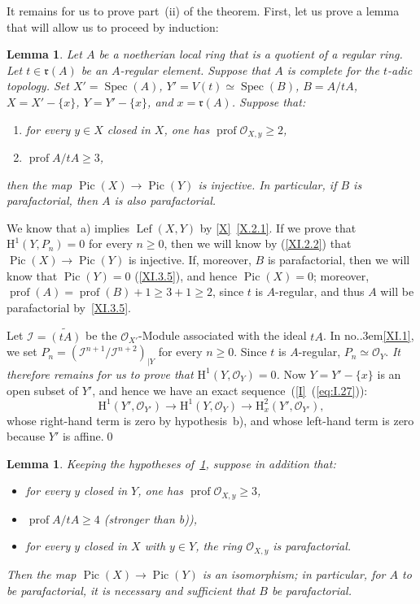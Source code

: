 \documentclass[11pt,a4paper,oneside]{book}
\providecommand{\sisi}[2]{#2}
\providecommand{\pageoriginale}{%
  \refstepcounter{pageoriginal}%
  \marginpar{\raggedright\footnotesize\bfseries\thepageoriginal}%
  \xspace}
\providecommand{\numero}{no.\kern.3em}
\providecommand{\quoi}{}
\providecommand{\Ii}{\mathcal I}
\providecommand{\Oo}{\mathcal O}
\providecommand{\ideal}[1]{\mathfrak{#1}}
\providecommand{\rr}{\ideal r}
\providecommand{\Spec}{\operatorname{Spec}}
\providecommand{\Pic}{\operatorname{Pic}}
\providecommand{\prof}{\operatorname{prof}}
\renewcommand{\H}{\mathrm H}
\providecommand{\Lef}{\operatorname{Lef}}
\newenvironment{enumeratea}
  {\begin{enumerate}[label=\alph*)]}
  {\end{enumerate}}
\theoremstyle{plain}
\newtheorem{lemme}[subsection]{Lemma}
\theoremstyle{definition}
\theoremstyle{remark}
\renewcommand{\Ref}[1]{\textup{\ref{#1}}}
\begin{document}
\medskip
It remains for us to prove part~(ii) of the theorem. First, let us prove a lemma that will allow us to proceed by induction:

\begin{lemme} \label{XI.3.16}
Let $A$ be a noetherian local ring that is a quotient of a regular ring. Let $t\in\rr(A)$ be an $A$-regular element. Suppose that $A$ is complete for the $t$-adic topology. Set $X'=\Spec(A)$, $Y'=V(t)\simeq \Spec(B)$, $B=A/tA$, $X=X'-\{x\}$, $Y=Y'-\{x\}$, and $x=\rr(A)$. Suppose that:
\begin{enumeratea}
\item
for every $y\in X$ closed in $X$, one has $\prof\Oo_{X, y}\geq 2$,
\item
$\prof A/tA\geq 3$,
\end{enumeratea}
\noindent
then\pageoriginale the map $\Pic(X)\to\Pic(Y)$ is injective. In particular, if $B$ is parafactorial, then $A$ is also parafactorial.
\end{lemme}

We know that a) implies $\Lef(X, Y)$ by \Ref{X}~\Ref{X.2.1}. If we prove that $\H^1(Y, P_n)=0$ for every $n\geq 0$, then we will know \sisi{\ignorespaces}{by} (\Ref{XI.2.2}) that $\Pic(X)\to\Pic(Y)$ is injective. If, moreover, $B$ is parafactorial, then we will know that $\Pic(Y)=0$ (\Ref{XI.3.5}), and hence $\Pic(X)=0$; moreover, $\prof(A)=\prof(B)+1\geq 3+1\geq 2$, since $t$ is $A$-regular, and thus $A$ will be parafactorial by~\Ref{XI.3.5}.

Let $\Ii=\widetilde{(tA)}$ be the $\Oo_{X'}$-Module associated with the ideal $tA$. In \numero \Ref{XI.1}, we set $P_n = \sisi{(\Ii^{n+1}/\Ii^{n+2}){|Y}}{(\Ii^{n+1}/\Ii^{n+2})_{|Y}}$ for every $n\geq 0$. Since $t$ is $A$-regular, $P_n\simeq \Oo_Y$. \emph{It therefore remains for us to prove that $\H^1(Y, \Oo_Y)=0$.} Now $Y = Y'-\{x\}$ is an open subset of $Y'$, and hence we have an exact sequence~(\Ref{I}~(\Ref{eq:I.27})):
\[
\H^1(Y', \Oo_{Y'})\to\H^1(Y, \Oo_{Y})\to\H^2_x(Y', \Oo_{Y'}){\quoi},
\]
whose right-hand term is zero by hypothesis~b), and whose left-hand term is zero because $Y'$ is affine.\qed

\begin{lemme} \label{XI.3.17}
Keeping the hypotheses of~\Ref{XI.3.16}, suppose in addition that:
\begin{itemize}
\item[c)] for every $y$ closed in $Y$, one has $\prof\Oo_{X, y}\geq 3$,
\item[d)] $\prof A/tA\geq 4$ (stronger than b)),
\item[e)] for every $y$ closed in $X$ with $y\in Y$, the ring $\Oo_{X, y}$ is parafactorial.
\end{itemize}
Then the map $\Pic(X)\to\Pic(Y)$ is an isomorphism; in particular, for $A$ to be parafactorial, it is necessary and sufficient that $B$ be parafactorial.
\end{lemme}
\end{document}
